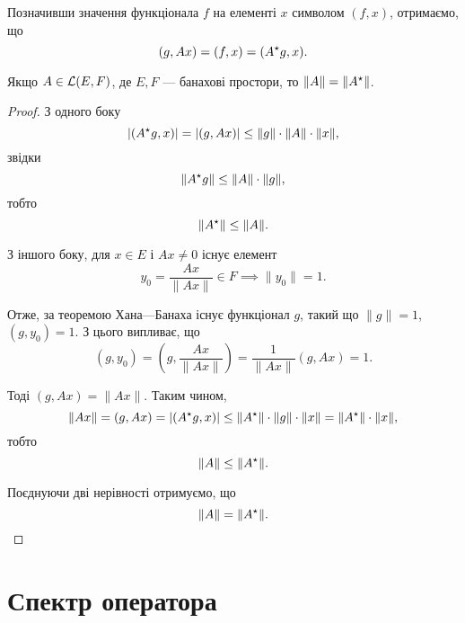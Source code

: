 Позначивши значення функціонала $f$ на елементі $x$
символом $(f, x)$, отримаємо, що
\begin{equation*}
    (g, Ax) = (f, x) = (A^\star g, x).    
\end{equation*}

\begin{theorem}
Якщо $A \in \mathcal{L}(E, F)$, де $E, F$ --- банахові
простори, то $\|A\| = \|A^\star\|$.
\end{theorem}

\begin{proof}
З одного боку
\begin{equation*}
    |(A^\star g, x)| = |(g, A x)| \le \|g\| \cdot \|A\| \cdot \|x\|,
\end{equation*}
звідки
\begin{equation*}
    \|A^\star g\| \le \|A\| \cdot \|g\|,
\end{equation*}
тобто
\begin{equation*}
    \|A^\star\| \le \|A\|.
\end{equation*}

З іншого боку, для $x \in E$ і $Ax \ne 0$ існує елемент
\begin{equation*}
    y_0 = \frac{Ax}{\|Ax\|} \in F \implies \|y_0\| = 1.
\end{equation*}

Отже, за теоремою Хана---Банаха існує функціонал $g$, такий
що $\|g\| = 1$, $(g, y_0) = 1$. З цього випливає, що
\begin{equation*}
    (g, y_0) = \left( g, \frac{Ax}{\|Ax\|} \right) = \frac{1}{\|Ax\|} (g, Ax) = 1.
\end{equation*}

Тоді $(g, Ax) = \|Ax\|$. Таким чином,
\begin{equation*}
    \|Ax\| = (g, Ax) = |(A^\star g, x)| \le \|A^\star\| \cdot \|g\| \cdot \|x\| = \|A^\star\| \cdot \|x\|,
\end{equation*}
тобто
\begin{equation*}
    \|A\| \le \|A^\star\|.
\end{equation*}

Поєднуючи дві нерівності отримуємо, що
\begin{equation*}
    \|A\| = \|A^\star\|. \qedhere
\end{equation*}
\end{proof}

\section{Спектр оператора}

